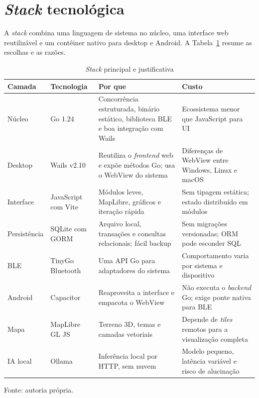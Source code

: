 \section{\textit{Stack} tecnológica}
\label{sec:stack}

A \textit{stack} combina uma linguagem de sistema no núcleo, uma interface web
reutilizável e um contêiner nativo para desktop e Android. A
Tabela~\ref{tab:stack} resume as escolhas e as razões.

\begin{table}[htbp]
    \centering
    \caption{\textit{Stack} principal e justificativa}
    \label{tab:stack}
    \small
    \begin{tabular}{@{}>{\raggedright\arraybackslash}p{2.8cm}
        >{\raggedright\arraybackslash}p{3.2cm}
        >{\raggedright\arraybackslash}p{4.4cm}
        >{\raggedright\arraybackslash}p{3.6cm}@{}}
        \toprule
        \textbf{Camada} & \textbf{Tecnologia} & \textbf{Por que} &
        \textbf{Custo} \\
        \midrule
        Núcleo & Go 1.24 & Concorrência estruturada, binário estático,
        biblioteca BLE e boa integração com Wails & Ecossistema menor que
        JavaScript para UI \\
        Desktop & Wails v2.10 & Reutiliza o \textit{frontend} web e expõe
        métodos Go; usa o WebView do sistema & Diferenças de WebView entre
        Windows, Linux e macOS \\
        Interface & JavaScript com Vite & Módulos leves, MapLibre, gráficos e
        iteração rápida & Sem tipagem estática; estado distribuído em módulos \\
        Persistência & SQLite com GORM & Arquivo local, transações e consultas
        relacionais; fácil backup & Sem migrações versionadas; ORM pode
        esconder SQL \\
        BLE & TinyGo Bluetooth & Uma API Go para adaptadores do sistema &
        Comportamento varia por sistema e dispositivo \\
        Android & Capacitor & Reaproveita a interface e empacota o WebView &
        Não executa o \textit{backend} Go; exige ponte nativa para BLE \\
        Mapa & MapLibre GL JS & Terreno 3D, temas e camadas vetoriais &
        Depende de \textit{tiles} remotos para a visualização completa \\
        IA local & Ollama & Inferência local por HTTP, sem nuvem & Modelo
        pequeno, latência variável e risco de alucinação \\
        \bottomrule
    \end{tabular}
    \vspace{0.2cm}
    \par\small Fonte: autoria própria.
\end{table}

